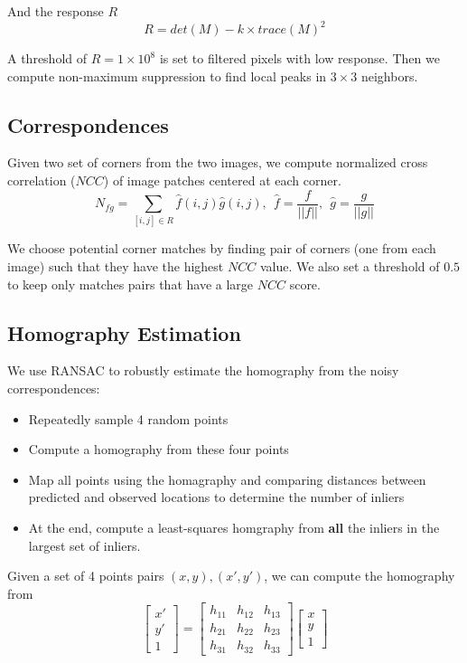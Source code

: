 \documentclass[letterpaper, 10 pt, conference]{ieeeconf}
\begin{document}
And the response $R$
\begin{equation}
R=det(M) - k\times trace(M)^2
\end{equation}

A threshold of $R = 1\times 10^8$ is set to filtered pixels with low response. Then we compute non-maximum suppression to find local peaks in $3\times3$ neighbors.
\subsection{Correspondences}
Given two set of corners from the two images, we compute normalized cross correlation ($NCC$) of image patches centered at each corner. 
\begin{equation}
N_{fg} = \sum_{[i, j]\in R}\hat{f}(i, j)\hat{g}(i, j),\ \ \hat{f} = \frac{f}{||f||}, \ \  \hat{g} = \frac{g}{||g||}
\end{equation}

We choose potential corner matches by finding pair of corners (one from each image) such that they have the highest $NCC$ value. We also set a threshold of $0.5$ to keep only matches pairs that have a large $NCC$ score.
\subsection{Homography Estimation}
We use RANSAC to robustly estimate the homography from the noisy correspondences:
\begin{itemize}
\item Repeatedly sample 4 random points
\item Compute a homography from these four points
\item Map all points using the homagraphy and comparing distances between predicted and observed locations to determine the number of inliers
\item At the end, compute a least-squares homgraphy from \textbf{all} the inliers in the largest set of inliers.
\end{itemize}

Given a set of 4 points pairs $(x,y), (x', y')$, we can compute the homography from
\begin{equation}
\left[ \begin{array}{c}
x'\\
y'\\
1
\end{array} \right] = \left[ \begin{array}{ccc}
h_{11} & h_{12} & h_{13} \\
h_{21} & h_{22} & h_{23} \\
h_{31} & h_{32} & h_{33} 
\end{array} \right]\left[ \begin{array}{c}
x\\
y\\
1
\end{array} \right] 
\end{equation}
\end{document}
